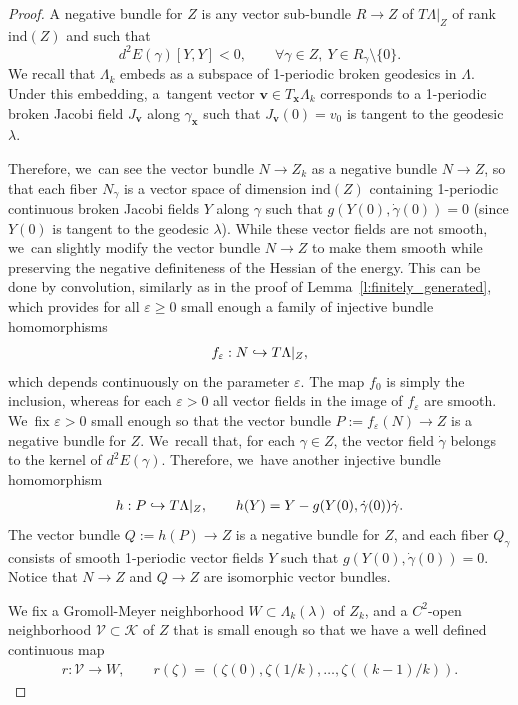 \documentclass[11pt]{article}
\let\epsilon\varepsilon
\newcommand\hto{\mathrel{\lhook\joinrel\to}}
\let\bm\boldsymbol
\newcommand{\KK}{\mathcal{K}}
\newcommand{\VV}{\mathcal{V}}
\newcommand{\xx}{\bm{x}}
\newcommand{\vv}{\bm{v}}
\newcommand{\ind}{\mathrm{ind}}
\theoremstyle{plain}
\theoremstyle{definition}
\begin{document}
\begin{proof}
A negative bundle for $Z$ is any vector sub-bundle $R\to Z$ of $T\Lambda|_Z$ of rank $\ind(Z)$ and such that
\[
d^2E(\gamma)[Y,Y]<0,\qquad\forall \gamma\in Z,\ Y\in R_\gamma\setminus\{0\}.
\]
We recall that $\Lambda_k$ embeds as a subspace of 1-periodic broken geodesics in $\Lambda$. Under this embedding, a~tangent vector $\vv\in T_{\xx}\Lambda_k$ corresponds to a 1-periodic broken Jacobi field $J_{\vv}$ along $\gamma_{\xx}$ such that $J_{\vv}(0)=v_0$ is tangent to the geodesic $\lambda$.

Therefore, we~can see the vector bundle $N\to Z_k$ as a negative bundle $N\to Z$, so that each fiber $N_{\gamma}$ is a vector space of dimension $\ind(Z)$ containing 1-periodic continuous broken Jacobi fields $Y$ along $\gamma$ such that $g(Y(0),\dot\gamma(0))=0$ (since $Y(0)$ is tangent to the geodesic $\lambda$).
While these vector fields are not smooth, we~can slightly modify the vector bundle $N\to Z$ to make them smooth while preserving the negative definiteness of the Hessian of the energy. This can be done by convolution, similarly as in the proof of Lemma~\ref{l:finitely_generated}, which provides for all $\epsilon\geq0$ small enough a family of injective bundle homomorphisms
\begin{align*}
f_\epsilon:N\hto T\Lambda|_{Z},
\end{align*}
which depends continuously on the parameter $\epsilon$. The map $f_0$ is simply the inclusion, whereas for each $\epsilon>0$ all vector fields in the image of $f_\epsilon$ are smooth. We~fix $\epsilon>0$ small enough so that the vector bundle $P:=f_\epsilon(N)\to Z$ is a negative bundle for $Z$. We~recall that, for each $\gamma\in Z$, the vector field $\dot\gamma$ belongs to the kernel of $d^2E(\gamma)$. Therefore, we~have another injective bundle homomorphism
\begin{align*}
h:P\hto T\Lambda|_Z,\qquad h(Y)=Y-g(Y(0),\dot\gamma(0))\dot\gamma.
\end{align*}
The vector bundle $Q:=h(P)\to Z$ is a negative bundle for $Z$, and each fiber $Q_\gamma$ consists of smooth 1-periodic vector fields $Y$ such that $g(Y(0),\dot\gamma(0))=0$. Notice that $N\to Z$ and $Q\to Z$ are isomorphic vector bundles.

We fix a Gromoll-Meyer neighborhood $W\subset\Lambda_k(\lambda)$ of $Z_k$, and a $C^2$-open neighborhood $\VV\subset\KK$ of $Z$ that is small enough so that we have a well defined continuous map
\begin{align*}
r:\VV\to W,\qquad r(\zeta)=(\zeta(0),\zeta(1/k),\dots,\zeta((k-1)/k)).
\end{align*}


\end{proof}
\end{document}
